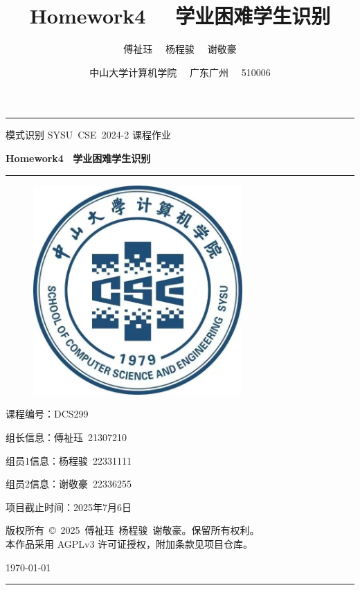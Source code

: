 \documentclass[a4paper, utf8]{ctexart}
\title{\songti \Large \textbf{Homework4 \ \  学业困难学生识别}}
\author{\fangsong 傅祉珏 \ \  杨程骏 \ \  谢敬豪}
\date{\fangsong 中山大学计算机学院 \ \  广东广州 \ \  510006}
\renewcommand*{\songti}{\CJKfamily{zhsong}}
\begin{document}
	\begin{titlepage}
		\centering
		\rule{\textwidth}{1pt}
		\vspace{0.02\textheight}
		
		{\LARGE \kaishu 模式识别 \quad SYSU\ CSE\ 2024-2 \quad 课程作业}
		
		\vspace{0.02\textheight}
		
		{\Huge \songti \bfseries Homework4 \  学业困难学生识别}
		
		\vspace{0.025\textheight}
		\rule{0.83\textwidth}{0.4pt}
		\vspace{0.025\textheight}
		\begin{figure}[htbp]
			\centering
			\includegraphics[width=8cm, height=8cm]{./figure/计院院徽.jpg}
		\end{figure}
		
		\vspace{0.035\textheight} 
		{\Large 课程编号：\textsc{DCS299}}
		
		\vspace{0.025\textheight} 
        {\Large 组长信息：\textsc{傅祉珏\ 21307210}}

        \vspace{0.025\textheight} 
        {\Large 组员1信息：\textsc{杨程骏\ 22331111}}

        \vspace{0.025\textheight} 
        {\Large 组员2信息：\textsc{谢敬豪\ 22336255}}
		
		\vspace{0.025\textheight} 
		{\Large 项目截止时间：\textsc{2025年7月6日}}
		
		\vspace{0.025\textheight} 
		{\small \kaishu 版权所有\ \copyright\ 2025\ 傅祉珏\ 杨程骏\ 谢敬豪。保留所有权利。\\
		本作品采用 AGPLv3 许可证授权，附加条款见项目仓库。}
		
		\vspace{0.025\textheight} 
		{\large \today}
		\vspace{0.1\textheight}
		\rule{\textwidth}{1pt}
	\end{titlepage}
	\let\cleardoublepage\clearpage
	
\end{document}
